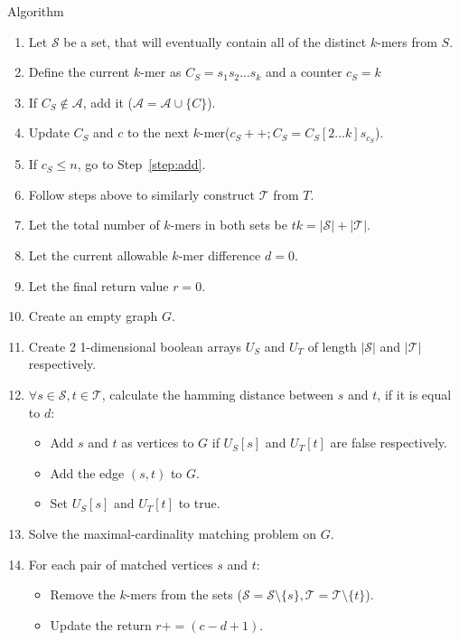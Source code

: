 \documentclass[11pt, oneside]{article}   	%
\newcommand{\kmer}{$k$-mer\xspace}
\newcommand{\kmers}{\kmer{}s\xspace}
\begin{document}
{\Large Algorithm}\\
\begin{enumerate}
\item \label{step:start} Let $\mathcal{S}$ be a set, that will eventually contain all of the distinct \kmers from $S$.
\item \label{step:init} Define the current \kmer as $C_S = s_1s_2...s_k$ and a counter $c_S = k$
\item \label{step:add} If $C_S \notin \mathcal{A}$, add it ($\mathcal{A} = \mathcal{A} \cup \{C\}$).
\item \label{step:next} Update $C_S$ and $c$ to the next \kmer ($c_S++ ; C_S = C_S[2...k]s_{c_S}$).
\item \label{step:gotokkmer} If $c_S \le n$, go to Step~\ref{step:add}. 
\item \label{step:finishExtract}Follow steps above to similarly construct $\mathcal{T}$ from $T$.
\item \label{step:Tkmer} Let the total number of \kmers in both sets be $tk = |\mathcal{S}| + |\mathcal{T}|$.
\item Let the current allowable \kmer difference $d = 0$. 
\item Let the final return value $r = 0$. 
\item Create an empty graph $G$. 
\item \label{step:graph} Create 2 1-dimensional boolean arrays $U_S$ and $U_T$ of length $|\mathcal{S}|$ and $|\mathcal{T}|$ respectively.
\item \label{step:hamming} $\forall s \in \mathcal{S}, t \in \mathcal{T}$, calculate the hamming distance between $s$ and $t$, if it is equal to $d$:
\begin{itemize}
\item Add $s$ and $t$ as vertices to $G$ if $U_S[s]$ and $U_T[t]$ are false respectively.
\item Add the edge $(s,t)$ to $G$.
\item Set $U_S[s]$ and $U_T[t]$ to true. 
\end{itemize}
\item \label{step:mcm} Solve the maximal-cardinality matching problem on $G$. 
\item \label{step:processMatch} For each pair of matched vertices $s$ and $t$:
\begin{itemize}
\item Remove the \kmers from the sets ($\mathcal{S} = \mathcal{S} \setminus \{s\}, \mathcal{T} = \mathcal{T} \setminus \{t\}$). 
\item Update the return $r += (c - d + 1)$.

\end{itemize}
\end{enumerate}
\end{document}
